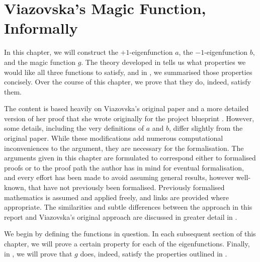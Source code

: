 \chapter{Viazovska's Magic Function, Informally}
\label{Ch4:Chapter}
\thispagestyle{empty}

In this chapter, we will construct the $+1$-eigenfunction $a$, the $-1$-eigenfunction $b$, and the magic function $g$. The theory developed in  tells us what properties we would like all three functions to satisfy, and in , we summarised those properties concisely. Over the course of this chapter, we prove that they do, indeed, satisfy them.

The content is based heavily on Viazovska's original paper \cite[\S 4]{Viazovska8} and a more detailed version of her proof that she wrote originally for the project blueprint \cite[\S 7]{blueprint}. However, some details, including the very definitions of $a$ and $b$, differ slightly from the original paper. While these modifications add numerous computational inconveniences to the argument, they are necessary for the formalisation. The arguments given in this chapter are formulated to correspond either to formalised proofs or to the proof path the author has in mind for eventual formalisation, and every effort has been made to avoid assuming general results, however well-known, that have not previously been formalised. Previously formalised mathematics is assumed and applied freely, and links are provided where appropriate. The similarities and subtle differences between the approach in this report and Viazovska's original approach are discussed in greater detail in .

We begin by defining the functions in question. In each subsequent section of this chapter, we will prove a certain property for each of the eigenfunctions. Finally, in , we will prove that $g$ does, indeed, satisfy the properties outlined in .







